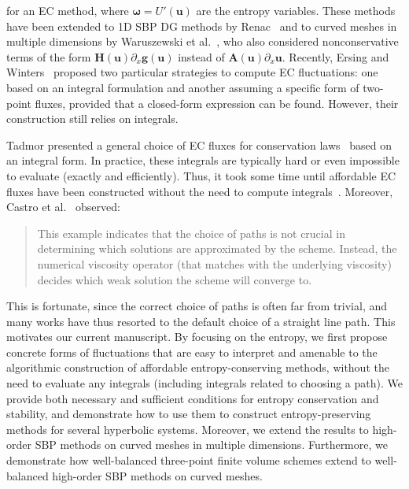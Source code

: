 \documentclass[]{scrartcl}
\renewcommand{\vec}[1]{\boldsymbol{#1}}
\theoremstyle{definition}
\begin{document}
for an EC method, where $\vec{\omega} = U'(\vec{u})$ are the entropy variables.
These methods have been extended to 1D SBP DG methods by Renac~\cite{RENAC20191,coquel2021entropy} and to curved meshes in multiple dimensions by Waruszewski et al.~\cite{WARUSZEWSKI2022111507}, who also considered nonconservative terms of the form $\vec{H}(\vec{u}) \partial_x \vec{g}(\vec{u})$ instead of $\vec{A}(\vec{u}) \partial_x \vec{u}$.
Recently, Ersing and Winters~\cite{ersing2026newclassentropystable} proposed two particular strategies to compute EC fluctuations: one based on an integral formulation and another assuming a specific form of two-point fluxes, provided that a closed-form expression can be found.
However, their construction still relies on integrals.

Tadmor presented a general choice of EC fluxes for conservation laws~\cite{Tadmor1987,Tadmor2003} based on an integral form.
In practice, these integrals are typically hard or even impossible to evaluate (exactly and efficiently).
Thus, it took some time until affordable EC fluxes have been constructed without the need to compute integrals~\cite{ismail2009affordable,ECChandra,Ranocha2018}.
Moreover, Castro et al.~\cite[Remark~4.2]{Castro2013} observed:
\begin{quote}
    This example indicates that the choice of paths is not crucial in determining which solutions are approximated by the scheme.
    Instead, the numerical viscosity operator (that matches with the underlying viscosity) decides which weak solution the scheme will converge to.
\end{quote}
This is fortunate, since the correct choice of paths is often far from trivial, and many works have thus resorted to the default choice of a straight line path.
This motivates our current manuscript.
By focusing on the entropy, we first propose concrete forms of fluctuations that are easy to interpret and amenable to the algorithmic construction of affordable entropy-conserving methods, without the need to evaluate any integrals (including integrals related to choosing a path).
We provide both necessary and sufficient conditions for entropy conservation and stability, and demonstrate how to use them to construct entropy-preserving methods for several hyperbolic systems.
Moreover, we extend the results to high-order SBP methods on curved meshes in multiple dimensions.
Furthermore, we demonstrate how well-balanced three-point finite volume schemes extend to well-balanced high-order SBP methods on curved meshes.
\end{document}
